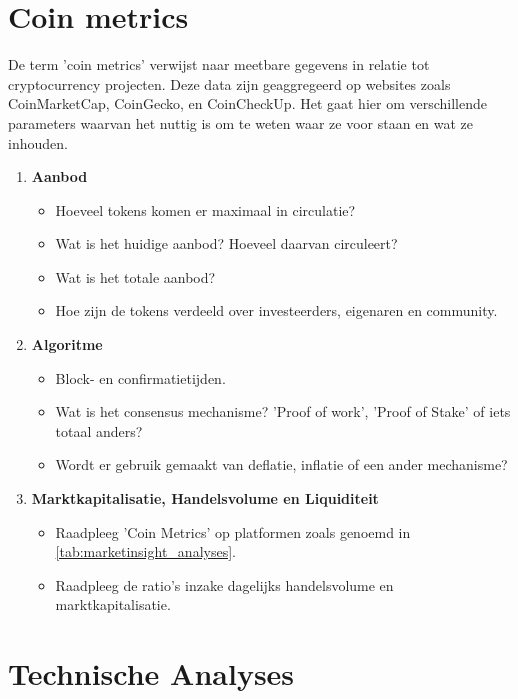  \newpage

\section{Coin metrics}
De term 'coin metrics' verwijst naar meetbare gegevens in relatie tot cryptocurrency projecten. Deze data zijn geaggregeerd op websites zoals CoinMarketCap, CoinGecko, en CoinCheckUp. Het gaat hier om verschillende parameters waarvan het nuttig is om te weten waar ze voor staan en wat ze inhouden.  

\begin{enumerate}
    \item \textbf{Aanbod}
    \begin{itemize}
        \item Hoeveel tokens komen er maximaal in circulatie?  
        \item Wat is het huidige aanbod? Hoeveel daarvan circuleert?
        \item Wat is het totale aanbod?
        \item Hoe zijn de tokens verdeeld over investeerders, eigenaren en community.
    \end{itemize}
    \item \textbf{Algoritme}
    \begin{itemize}
        \item Block- en confirmatietijden.
        \item Wat is het consensus mechanisme? 'Proof of work', 'Proof of Stake' of iets totaal anders?
         \item Wordt er gebruik gemaakt van deflatie, inflatie of een ander mechanisme?
            \end{itemize}
    \item \textbf{Marktkapitalisatie, Handelsvolume en Liquiditeit}
    \begin{itemize}
        \item Raadpleeg 'Coin Metrics' op platformen zoals genoemd in \cref{tab:marketinsight_analyses}.
        \item Raadpleeg de ratio's inzake dagelijks handelsvolume en marktkapitalisatie.
    \end{itemize}
\end{enumerate}

\section{Technische Analyses}
\label{sec:technicalanalysis}

